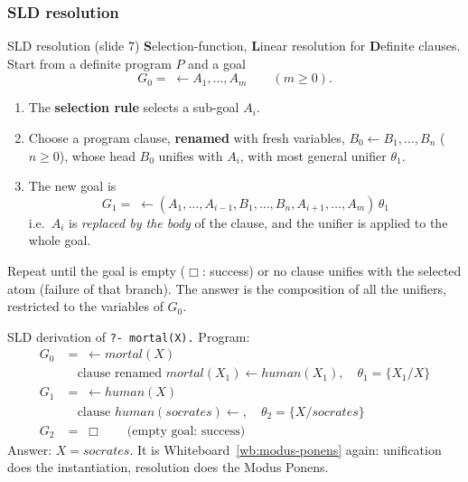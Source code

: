 \subsubsection{SLD resolution}

\begin{nbdef}{SLD resolution (slide 7)}
\textbf{S}election-function, \textbf{L}inear resolution for \textbf{D}efinite clauses.
Start from a definite program $P$ and a goal
\[ G_0 = \;\leftarrow A_1, \ldots, A_m \qquad (m \geq 0). \]
\begin{enumerate}[nosep]
  \item The \textbf{selection rule} selects a sub-goal $A_i$.
  \item Choose a program clause, \textbf{renamed} with fresh variables,
        $B_0 \leftarrow B_1, \ldots, B_n$ ($n \geq 0$), whose head $B_0$ unifies with $A_i$,
        with most general unifier $\theta_1$.
  \item The new goal is
        \[ G_1 = \;\leftarrow (A_1, \ldots, A_{i-1}, B_1, \ldots, B_n, A_{i+1}, \ldots, A_m)\,\theta_1 \]
        i.e.\ $A_i$ is \emph{replaced by the body} of the clause, and the unifier is applied
        to the whole goal.
\end{enumerate}
Repeat until the goal is empty ($\Box$: success) or no clause unifies with the selected atom
(failure of that branch). The answer is the composition of all the unifiers, restricted to
the variables of $G_0$.
\end{nbdef}

\begin{nbexample}{SLD derivation of \texttt{?- mortal(X).}}
Program:  \ 
\begin{align*}
G_0 &= \;\leftarrow \mathit{mortal}(X) \\
  &\quad \text{clause renamed } \mathit{mortal}(X_1) \leftarrow \mathit{human}(X_1),\quad
     \theta_1 = \{X_1 / X\} \\
G_1 &= \;\leftarrow \mathit{human}(X) \\
  &\quad \text{clause } \mathit{human}(\mathit{socrates}) \leftarrow,\quad
     \theta_2 = \{X / \mathit{socrates}\} \\
G_2 &= \;\Box \qquad \text{(empty goal: success)}
\end{align*}
Answer: $X = \mathit{socrates}$. It is Whiteboard~\ref{wb:modus-ponens} again: unification
does the instantiation, resolution does the Modus Ponens.
\end{nbexample}

